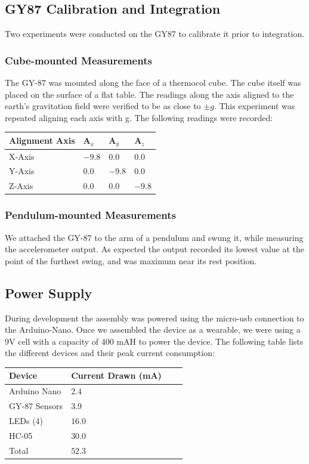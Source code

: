 \documentclass[11pt, a4paper]{article}
\begin{document}
\subsection{GY87 Calibration and Integration}
Two experiments were conducted on the GY87 to calibrate it prior to
integration.

\subsubsection{Cube-mounted Measurements}
The GY-87 was mounted along the face of a thermocol cube. The cube itself was
placed on the surface of a flat table. The readings along the axis aligned to
the earth's gravitation field were verified to be as close to $\pm g$. This
experiment was repeated aligning each axis with g. The following readings were
recorded:

\begin{center}
   \begin{tabular}{llll}
      \hline
      Alignment Axis & A$_{x}$ & A$_{y}$ & A$_{z}$\\
      \hline
      X-Axis & $-9.8$ & $0.0$ & $0.0$ \\
      Y-Axis & $0.0$ & $-9.8$ & $0.0$ \\
      Z-Axis & $0.0$ & $0.0$ & $-9.8$ \\
      \hline
   \end{tabular}
\end{center}

\subsubsection{Pendulum-mounted Measurements}
We attached the GY-87 to the arm of a pendulum and swung it, while measuring
the accelerometer output. As expected the output recorded its lowest value at
the point of the furthest swing, and was maximum near its rest position. 

\subsection{Power Supply}
During development the assembly was powered using the micro-usb connection to
the Arduino-Nano. Once we assembled the device as a wearable, we were using a
9V cell with a capacity of 400 mAH to power the device. The following table
lists the different devices and their peak current consumption:

\begin{center}
   \begin{tabular}{llll}
      \hline
      Device & Current Drawn (mA) \\
      \hline
      Arduino Nano & $2.4$ \\
      GY-87 Sensors & $3.9$ \\
      LEDs (4) & $16.0$ & \\
      HC-05 & $30.0$ \\
      \hline
      Total & $52.3$ \\
      \hline
   \end{tabular}
\end{center}
\end{document}
